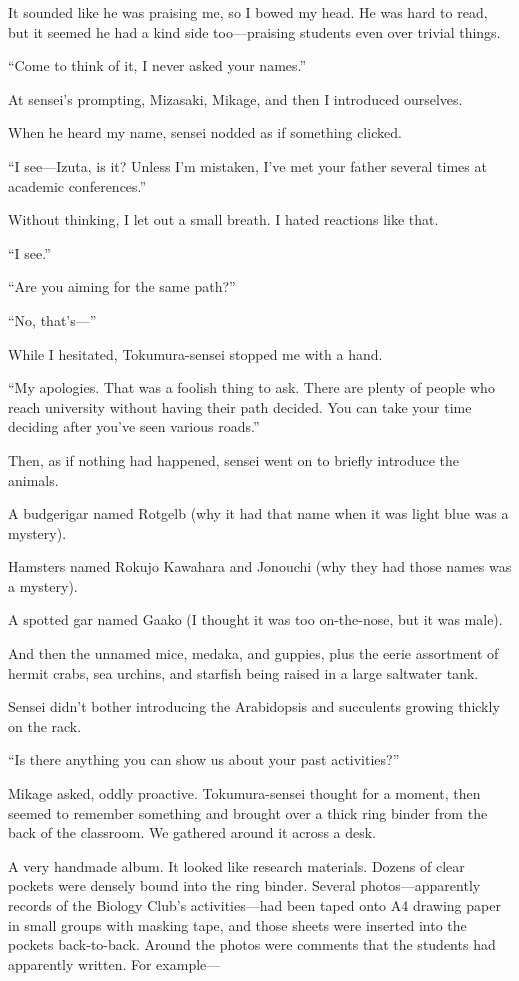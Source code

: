 \documentclass[
    a4paper,
    12pt,
    twoside,
    openany,
    UTF8,
    fontset=windows
]{ctexbook}
\begin{document}
It sounded like he was praising me, so I bowed my head. He was hard to read, but it seemed he had a kind side too---praising students even over trivial things.

``Come to think of it, I never asked your names.''

At sensei's prompting, Mizasaki, Mikage, and then I introduced ourselves.

When he heard my name, sensei nodded as if something clicked.

``I see---Izuta, is it? Unless I'm mistaken, I've met your father several times at academic conferences.''

Without thinking, I let out a small breath. I hated reactions like that.

``I see.''

``Are you aiming for the same path?''

``No, that's---''

While I hesitated, Tokumura-sensei stopped me with a hand.

``My apologies. That was a foolish thing to ask. There are plenty of people who reach university without having their path decided. You can take your time deciding after you've seen various roads.''

Then, as if nothing had happened, sensei went on to briefly introduce the animals.

A budgerigar named Rotgelb (why it had that name when it was light blue was a mystery).

Hamsters named Rokujo Kawahara and Jonouchi (why they had those names was a mystery).

A spotted gar named Gaako (I thought it was too on-the-nose, but it was male).

And then the unnamed mice, medaka, and guppies, plus the eerie assortment of hermit crabs, sea urchins, and starfish being raised in a large saltwater tank.

Sensei didn't bother introducing the Arabidopsis and succulents growing thickly on the rack.

``Is there anything you can show us about your past activities?''

Mikage asked, oddly proactive. Tokumura-sensei thought for a moment, then seemed to remember something and brought over a thick ring binder from the back of the classroom. We gathered around it across a desk.

A very handmade album. It looked like research materials. Dozens of clear pockets were densely bound into the ring binder. Several photos---apparently records of the Biology Club's activities---had been taped onto A4 drawing paper in small groups with masking tape, and those sheets were inserted into the pockets back-to-back. Around the photos were comments that the students had apparently written. For example---
\end{document}
